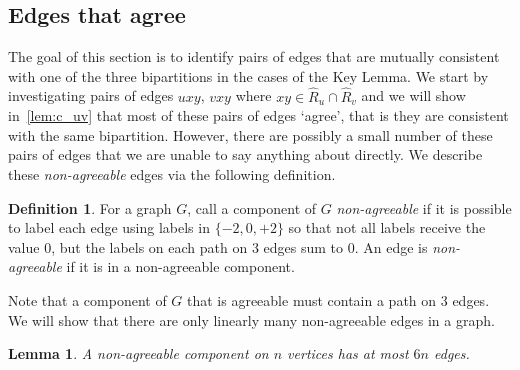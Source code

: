\documentclass[A4paper,12pt]{article}
\newtheorem{lem}[thm]{Lemma}
\theoremstyle{definition}
\newtheorem{define}[thm]{Definition}
\begin{document}
\subsection{Edges that agree}

The goal of this section is to identify pairs of edges that are mutually consistent with one of the three bipartitions in the cases of the Key Lemma. We start by investigating pairs of edges $uxy$, $vxy$ where $xy \in \hat{R}_u \cap \hat{R}_v$ and we will show in~\cref{lem:c_uv} that most of these pairs of edges `agree', that is they are consistent with the same bipartition. However, there are possibly a small number of these pairs of edges that we are unable to say anything about directly. We describe these \emph{non-agreeable} edges via the following definition.

\begin{define} For a graph $G$, call a component of $G$ \emph{non-agreeable} if it is possible to label each edge using labels in $\{-2,0,+2\}$ so that not all labels receive the value $0$, but the labels on each path on 3 edges sum to $0$. An edge is \emph{non-agreeable} if it is in a non-agreeable component. 
\end{define}

Note that a component of $G$ that is agreeable must contain a path on 3 edges. We will show that there are only linearly many non-agreeable edges in a graph.

\begin{lem}
\label{annoying}
A non-agreeable component on $n$
vertices has at most $6n$ edges. 
\end{lem}
\end{document}
